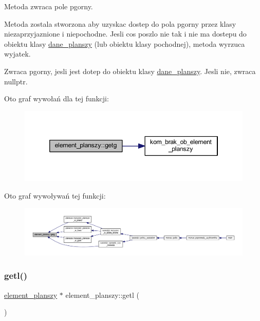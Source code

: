 Metoda zwraca pole pgorny.

Metoda zostala stworzona aby uzyskac dostep do pola pgorny przez klasy niezaprzyjaznione i niepochodne. Jesli cos poszlo nie tak i nie ma dostepu do obiektu klasy \mbox{\hyperlink{classdane__planszy}{dane\+\_\+planszy}} (lub obiektu klasy pochodnej), metoda wyrzuca wyjatek. \begin{DoxyReturn}{Zwraca}
pgorny, jesli jest dotep do obiektu klasy \mbox{\hyperlink{classdane__planszy}{dane\+\_\+planszy}}. Jesli nie, zwraca nullptr. 
\end{DoxyReturn}
Oto graf wywołań dla tej funkcji\+:
\nopagebreak
\begin{figure}[H]
\begin{center}
\leavevmode
\includegraphics[width=346pt]{classelement__planszy_a4b0995862555562ac47fb3f57da610f8_cgraph}
\end{center}
\end{figure}
Oto graf wywoływań tej funkcji\+:
\nopagebreak
\begin{figure}[H]
\begin{center}
\leavevmode
\includegraphics[width=350pt]{classelement__planszy_a4b0995862555562ac47fb3f57da610f8_icgraph}
\end{center}
\end{figure}
\mbox{\label{classelement__planszy_a5be5b94cdbbdf68ec426d55789c6579a}} 
\subsubsection{\texorpdfstring{getl()}{getl()}}
{\footnotesize\ttfamily \mbox{\hyperlink{classelement__planszy}{element\+\_\+planszy}} $\ast$ element\+\_\+planszy\+::getl (\begin{DoxyParamCaption}{ }\end{DoxyParamCaption})}

